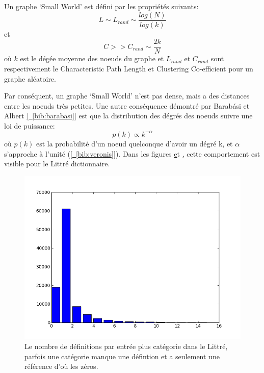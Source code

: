 Un graphe `Small World' est défini par les propriétés suivants:
$$L \sim L_{rand} \sim \frac{log(N)}{log(k)} $$
et
$$C >> C_{rand} \sim \frac{2k}{N} $$
où $k$ est le dégée moyenne des noeuds du graphe et $L_{rand}$ et $C_{rand}$ sont respectivement
le Characteristic Path Length et Clustering Co-efficient pour un graphe aléatoire.

Par conséquent, un graphe `Small World' n'est pas dense, mais a des distances entre les noeuds
très petites. Une autre conséquence démontré par Barabási et Albert
\hyperref[bib:barabasi]{[~\ref*{bib:barabasi}]} est que la distribution des dégrés
des noeuds suivre une loi de puissance:
$$ p(k) \propto k^{-\alpha}$$
où $p(k)$ est la probabilité d'un noeud quelconque d'avoir un dégré k, et
$\alpha$ s'approche à l'unité (\hyperref[bib:veronis]{[~\ref*{bib:veronis}]}). Dans les
figures \hyperref[fig:ndefinitionsperentry] et \hyperref[fig:nmotsperentry], cette
comportement est visible pour le Littré dictionnaire.

\begin{figure}
\begin{center}
\includegraphics{Images/definitions_per_entry_cat.png}
\caption{Le nombre de définitions par entrée plus catégorie dans le Littré,
parfois une catégorie manque une
défintion et a seulement une référence d'où les zéros.}
\label{fig:ndefinitionsperentry}
\end{center}
\end{figure}


